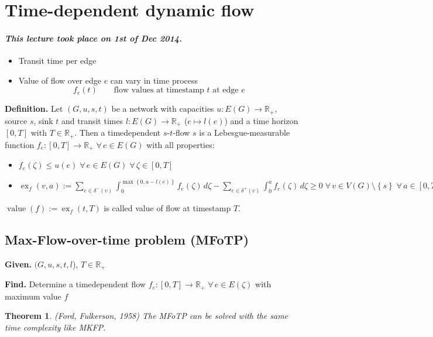 \documentclass{article}
\newtheorem{theorem}{Theorem}
\newcommand{\set}[1]{\left\{#1\right\}}
\newcommand{\given}[1]{\textbf{Given.} #1\par}
\newcommand{\find}[1]{\textbf{Find.} #1\par}
\newcommand{\dateref}[1]{\paragraph{\textit{This lecture took place on #1.}}}
\newcommand{\flow}[2]{$#1$-$#2$-flow}
\newcommand{\fall}{\;\forall\,}
\begin{document}
\section{Time-dependent dynamic flow}
%
\dateref{1st of Dec 2014}
\begin{itemize}
  \item Transit time per edge
  \item Value of flow over edge $e$ can vary in time process
    \[ f_e(t) \qquad \text{flow values at timestamp $t$ at edge $e$} \]
\end{itemize}

\textbf{Definition.}
  Let $(G, u, s, t)$ be a network with capacities $u: E(G) \rightarrow \mathbb{R}_+$, source $s$, sink $t$ and transit times $l: E(G) \rightarrow \mathbb{R}_+$ ($e \mapsto l(e)$) and a time horizon $[0, T]$ with $T \in \mathbb{R}_+$. Then a timedependent \flow st $s$ is a Lebesgue-measurable function $f_e: [0, T] \rightarrow \mathbb{R}_+ \fall e \in E(G)$ with all properties:
  \begin{itemize}
    \item $f_e(\zeta) \leq u(e) \fall e \in E(G) \fall \zeta \in [0, T]$
    \item $\operatorname{ex}_f(v, a) :=
      \sum_{e \in \delta^-(v)} \int_0^{\max\set{0, a-l(e)}} f_e(\zeta) \,d\zeta
      - \sum_{e \in \delta^+(v)} \int_0^a f_e(\zeta) \, d\zeta \geq 0
      \fall v \in V(G) \setminus \set{s} \fall a \in [0, T]$
  \end{itemize}

$\operatorname{value}(f) := \operatorname{ex}_f(t, T)$ is called value of flow at timestamp $T$.

\subsection{Max-Flow-over-time problem (MFoTP)}
\given{$(G, u, s, t, l$), $T \in \mathbb{R}_+$}
\find{Determine a timedependent flow $f_e: [0, T] \rightarrow \mathbb{R}_+ \fall e \in E(\zeta)$ with maximum value $f$}

\begin{theorem}\label{satz-5.21}
  (Ford, Fulkerson, 1958)
  The MFoTP can be solved with the same time complexity like MKFP.
\end{theorem}
\end{document}

